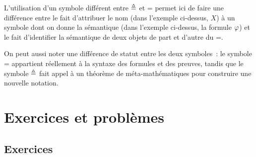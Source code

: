 \begin{remark}
  L'utilisation d'un symbole différent entre $\mathord{\triangleq}$ et $\mathord{=}$
  permet ici de faire une différence entre le fait d'attribuer le nom (dans
  l'exemple ci-dessus, $X$) à un symbole dont on donne la sémantique
  (dans l'exemple ci-dessus, la formule $\varphi$) et le fait d'identifier la
  sémantique de deux objets de part et d'autre du $\mathord{=}$.

  On peut aussi noter une différence de statut entre les deux symboles~: le
  symbole $\mathord{=}$ appartient réellement à la syntaxe des formules et des
  preuves, tandis que le symbole $\mathord{\triangleq}$ fait appel à un théorème
  de méta-mathématiques pour construire une nouvelle notation.
\end{remark}

\clearpage

\section{Exercices et problèmes}

\subsection{Exercices}

